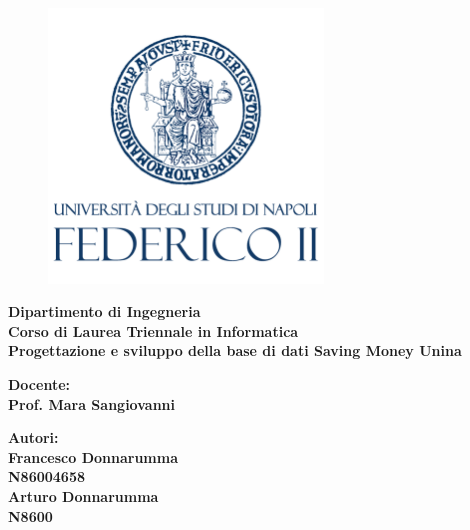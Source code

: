\begin{titlepage} %
    \begin{figure}[t] %
        \centering\includegraphics[width=0.65\textwidth]{images/FII_logo.png}
    \end{figure}
    \vspace{20mm}
    
    \begin{Large}
     \begin{center}
        \textbf{Dipartimento di Ingegneria\\ Corso di Laurea Triennale in Informatica\\}
        \vspace{20mm}
        \vspace{10mm}
        {\huge{\bf Progettazione e sviluppo della base di dati Saving Money Unina}}\\
    \end{center}
    \end{Large}
    
    
    \vspace{36mm}
    \begin{minipage}[t]{0.47\textwidth}
        {\large{\bf Docente:\\ Prof. Mara Sangiovanni}}
    \end{minipage}
    \hfill
    \begin{minipage}[t]{0.47\textwidth}\raggedleft
        {\large{\bf Autori: \\ Francesco Donnarumma\\ N86004658\\ Arturo Donnarumma\\ N8600\\}}
    \end{minipage}
    
    \vspace{25mm}
    
    \hrulefill
    
    \vspace{5mm}
    
    
    \end{titlepage}